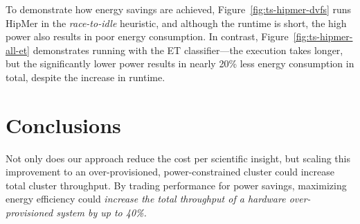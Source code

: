 \documentclass[a0,portrait]{a0poster}
\newcommand{\figref}[1]{Figure~\ref{fig:#1}}
\begin{document}
\begin{multicols}{2}
To demonstrate how energy savings are achieved, \figref{ts-hipmer-dvfs} runs HipMer in the \emph{race-to-idle} heuristic, and although the runtime is short, the high power also results in poor energy consumption.
In contrast, \figref{ts-hipmer-all-et} demonstrates running with the ET classifier---the execution takes longer, but the significantly lower power results in nearly 20\% less energy consumption in total, despite the increase in runtime.











\color{SaddleBrown} %

\section*{Conclusions}

Not only does our approach reduce the cost per scientific insight, but scaling this improvement to an over-provisioned, power-constrained cluster could increase total cluster throughput.
By trading performance for power savings, maximizing energy efficiency could \emph{increase the total throughput of a hardware over-provisioned system by up to 40\%.}


\color{DarkSlateGray} %






\end{multicols}
\end{document}
